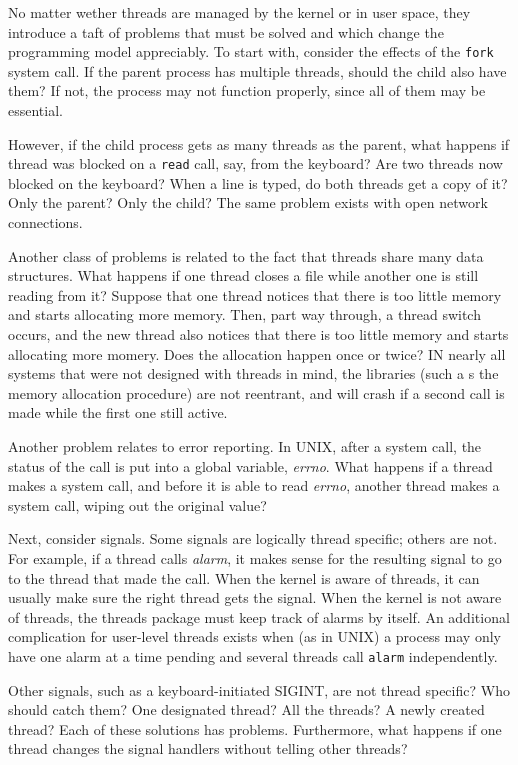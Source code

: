 \documentclass{book}
\newcommand {\sys} [1] {\textsl{#1}}
\newcommand {\cmd} [1] {\texttt{#1}}
\begin{document}
No matter wether threads are managed by the kernel or in user space, they introduce a taft of problems
that must be solved and which change the programming model appreciably.
To start with, consider the effects of the \cmd{fork} system call.
If the parent process has multiple threads, should the child also have them?
If not, the process may not function properly, since all of them may be essential.

However, if the child process gets as many threads as the parent, 
what happens if thread was blocked on a \cmd{read} call, say, from the keyboard?
Are two threads now blocked on the keyboard?
When a line is typed, do both threads get a copy of it?
Only the parent?
Only the child?
The same problem exists with open network connections.

Another class of problems is related to the fact that threads share many data structures.
What happens if one thread closes a file while another one is still reading from it?
Suppose that one thread notices that there is too little memory and starts allocating more memory.
Then, part way through, a thread switch occurs, 
and the new thread also notices that there is too little memory and starts allocating more momery.
Does the allocation happen once or twice?
IN nearly all systems that were not designed with threads in mind,
the libraries (such a s the memory allocation procedure) are not reentrant,
and will crash if a second call is made while the first one still active.

Another problem relates to error reporting.
In UNIX, after a system call, the status of the call is put into a global variable, \sys{errno}.
What happens if a thread makes a system call, and before it is able to read \sys{errno},
another thread makes a system call, wiping out the original value?

Next, consider signals.
Some signals are logically thread specific; others are not.
For example, if a thread calls \sys{alarm}, it makes sense for the resulting signal to go to the thread that made the call.
When the kernel is aware of threads, it can usually make sure the right thread gets the signal.
When the kernel is not aware of threads, the threads package must keep track of alarms by itself.
An additional complication for user-level threads exists when (as in UNIX) a process may only have one alarm at a time pending
and several threads call \cmd{alarm} independently.

Other signals, such as a keyboard-initiated SIGINT, are not thread specific?
Who should catch them?
One designated thread?
All the threads?
A newly created thread?
Each of these solutions has problems.
Furthermore, what happens if one thread changes the signal handlers without telling other threads?
\end{document}
